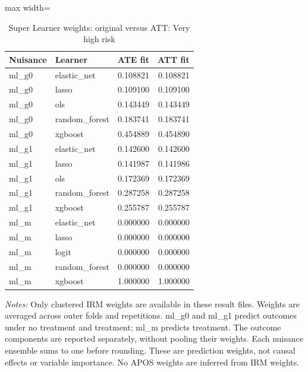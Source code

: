 \begin{table}[htbp]
\centering\scriptsize
\caption{Super Learner weights: original versus ATT: Very high risk}
\label{tab:table-ate-att-convex-weights-VeryHighRiskHome}
\begin{adjustbox}{max width=\linewidth}
\begin{tabular}{llrr}
\toprule
Nuisance & Learner & ATE fit & ATT fit \\
\midrule
ml\_g0 & elastic\_net & 0.108821 & 0.108821 \\
ml\_g0 & lasso & 0.109100 & 0.109100 \\
ml\_g0 & ols & 0.143449 & 0.143449 \\
ml\_g0 & random\_forest & 0.183741 & 0.183741 \\
ml\_g0 & xgboost & 0.454889 & 0.454890 \\
ml\_g1 & elastic\_net & 0.142600 & 0.142600 \\
ml\_g1 & lasso & 0.141987 & 0.141986 \\
ml\_g1 & ols & 0.172369 & 0.172369 \\
ml\_g1 & random\_forest & 0.287258 & 0.287258 \\
ml\_g1 & xgboost & 0.255787 & 0.255787 \\
ml\_m & elastic\_net & 0.000000 & 0.000000 \\
ml\_m & lasso & 0.000000 & 0.000000 \\
ml\_m & logit & 0.000000 & 0.000000 \\
ml\_m & random\_forest & 0.000000 & 0.000000 \\
ml\_m & xgboost & 1.000000 & 1.000000 \\
\bottomrule
\end{tabular}
\end{adjustbox}
\par\vspace{3pt}\begin{minipage}{\linewidth}\scriptsize\textit{Notes:} Only clustered IRM weights are available in these result files. Weights are averaged across outer folds and repetitions. ml\_g0 and ml\_g1 predict outcomes under no treatment and treatment; ml\_m predicts treatment. The outcome components are reported separately, without pooling their weights. Each nuisance ensemble sums to one before rounding. These are prediction weights, not causal effects or variable importance. No APOS weights are inferred from IRM weights.\end{minipage}
\end{table}
